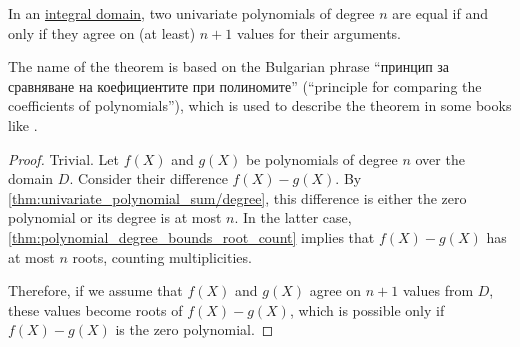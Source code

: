 \begin{theorem}\label{thm:polynomial_comparison_principle}
  In an \hyperref[def:integral_domain]{integral domain}, two univariate polynomials of degree \( n \) are equal if and only if they agree on (at least) \( n + 1 \) values for their arguments.
\end{theorem}
\begin{comments}
  \item The name of the theorem is based on the Bulgarian phrase \enquote{принцип за сравняване на коефициентите при полиномите} (\enquote{principle for comparing the coefficients of polynomials}), which is used to describe the theorem in some books like \cite[192]{Тагамлицки1971ДиференциалноСмятане}.
\end{comments}
\begin{proof}
  \SufficiencySubProof Trivial.
  \NecessitySubProof Let \( f(X) \) and \( g(X) \) be polynomials of degree \( n \) over the domain \( D \). Consider their difference \( f(X) - g(X) \). By \cref{thm:univariate_polynomial_sum/degree}, this difference is either the zero polynomial or its degree is at most \( n \). In the latter case, \cref{thm:polynomial_degree_bounds_root_count} implies that \( f(X) - g(X) \) has at most \( n \) roots, counting multiplicities.

  Therefore, if we assume that \( f(X) \) and \( g(X) \) agree on \( n + 1 \) values from \( D \), these values become roots of \( f(X) - g(X) \), which is possible only if \( f(X) - g(X) \) is the zero polynomial.
\end{proof}

